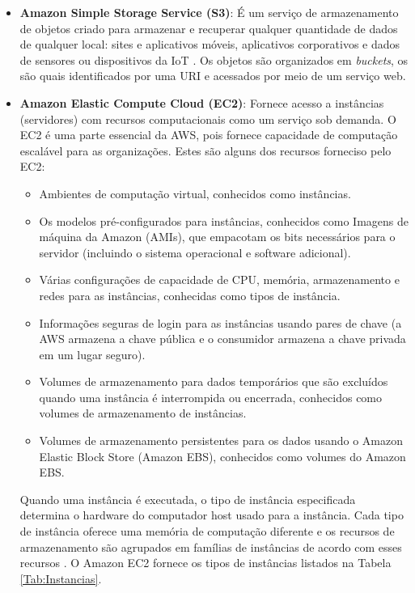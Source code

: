 \begin{itemize}

    \item \textbf{Amazon Simple Storage Service (S3)}: É um serviço de armazenamento de objetos criado para armazenar e recuperar qualquer quantidade de dados de qualquer local: sites e aplicativos móveis, aplicativos corporativos e dados de sensores ou dispositivos da IoT \cite{awsOverview}. Os objetos são organizados em \textit{buckets}, os são quais identificados por uma URI e acessados por meio de um serviço web.
    
    \item \textbf{Amazon Elastic Compute Cloud (EC2)}: Fornece acesso a instâncias (servidores) com recursos computacionais como um serviço sob demanda. O EC2 é uma parte essencial da AWS, pois fornece capacidade de computação escalável para as organizações. Estes são alguns dos recursos forneciso pelo EC2:
    \begin{itemize}
    \item Ambientes de computação virtual, conhecidos como instâncias.
    \item Os modelos pré-configurados para  instâncias, conhecidos como Imagens de máquina da Amazon (AMIs), que empacotam os bits necessários para o servidor (incluindo o sistema operacional e software adicional).
    \item Várias configurações de capacidade de CPU, memória, armazenamento e redes para as instâncias, conhecidas como tipos de instância.
    \item Informações seguras de login para as instâncias usando pares de chave (a AWS armazena a chave pública e o consumidor armazena a chave privada em um lugar seguro).
    \item Volumes de armazenamento para dados temporários que são excluídos quando uma instância é interrompida ou encerrada, conhecidos como volumes de armazenamento de instâncias.
    \item Volumes de armazenamento persistentes para os dados usando o Amazon Elastic Block Store (Amazon EBS), conhecidos como volumes do Amazon EBS.
 \end{itemize}
 
 
Quando uma instância é executada, o tipo de instância especificada determina o hardware do computador host usado para a instância. Cada tipo de instância oferece uma memória de computação diferente e os recursos de armazenamento são agrupados em famílias de instâncias de acordo com esses recursos \cite{awsInstances}. O Amazon EC2 fornece os tipos de instâncias listados na Tabela \ref{Tab:Instancias}.




\end{itemize}
